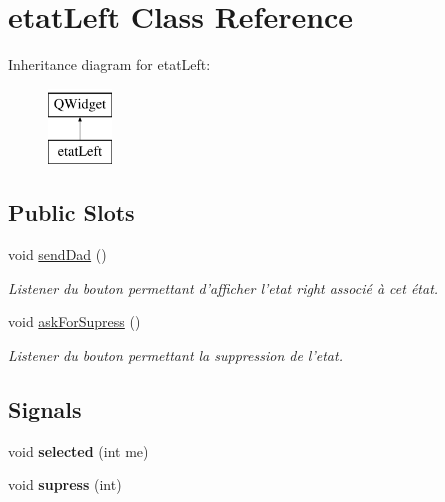 \hypertarget{classetat_left}{\section{etat\-Left Class Reference}
\label{classetat_left}
}
Inheritance diagram for etat\-Left\-:\begin{figure}[H]
\begin{center}
\leavevmode
\includegraphics[height=2.000000cm]{classetat_left}
\end{center}
\end{figure}
\subsection*{Public Slots}
\begin{DoxyCompactItemize}
\item 
\hypertarget{classetat_left_a39c9a7992253a787aeaa9a2b2be5a806}{void \hyperlink{classetat_left_a39c9a7992253a787aeaa9a2b2be5a806}{send\-Dad} ()}\label{classetat_left_a39c9a7992253a787aeaa9a2b2be5a806}

\begin{DoxyCompactList}\small\item\em Listener du bouton permettant d'afficher l'etat right associé à cet état. \end{DoxyCompactList}\item 
\hypertarget{classetat_left_a541d2de7f5227a558e6753f53c6b7ae6}{void \hyperlink{classetat_left_a541d2de7f5227a558e6753f53c6b7ae6}{ask\-For\-Supress} ()}\label{classetat_left_a541d2de7f5227a558e6753f53c6b7ae6}

\begin{DoxyCompactList}\small\item\em Listener du bouton permettant la suppression de l'etat. \end{DoxyCompactList}\end{DoxyCompactItemize}
\subsection*{Signals}
\begin{DoxyCompactItemize}
\item 
\hypertarget{classetat_left_a9c96e4ffbba54cfc6c281e4ab023b4e6}{void {\bfseries selected} (int me)}\label{classetat_left_a9c96e4ffbba54cfc6c281e4ab023b4e6}

\item 
\hypertarget{classetat_left_a8d4e53e9e84d7865f1f95f404cb55132}{void {\bfseries supress} (int)}\label{classetat_left_a8d4e53e9e84d7865f1f95f404cb55132}

\end{DoxyCompactItemize}
